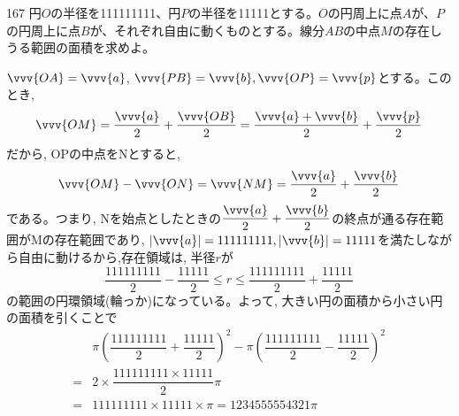 \begin{thm}{167}{}{}
 円$O$の半径を111111111、円$P$の半径を11111とする。$O$の円周上に点$A$が、$P$の円周上に点$B$が、それぞれ自由に動くものとする。線分$AB$の中点$M$の存在しうる範囲の面積を求めよ。 
\end{thm}

$\vvv{OA}=\vvv{a}$, $\vvv{PB}=\vvv{b}, \vvv{OP}=\vvv{p}$とする。このとき,
\[\vvv{OM}=\dfrac{\vvv{a}}{2}+\dfrac{\vvv{OB}}{2}=\dfrac{\vvv{a}+\vvv{b}}{2}+\dfrac{\vvv{p}}{2}\]
だから, OPの中点をNとすると, 
\[\vvv{OM}-\vvv{ON}=\vvv{NM}=\dfrac{\vvv{a}}{2}+\dfrac{\vvv{b}}{2}\]
である。つまり, Nを始点としたときの$\dfrac{\vvv{a}}{2}+\dfrac{\vvv{b}}{2}$の終点が通る存在範囲がMの存在範囲であり, $|\vvv{a}|=111111111, |\vvv{b}|=11111$を満たしながら自由に動けるから,存在領域は, 半径$r$が
\[\dfrac{111111111}{2}-\dfrac{11111}{2}\leq r\leq \dfrac{111111111}{2}+\dfrac{11111}{2}\]
の範囲の円環領域(輪っか)になっている。よって, 大きい円の面積から小さい円の面積を引くことで
\begin{align*}
&\pi\left(\dfrac{111111111}{2}+\dfrac{11111}{2}\right)^2 -\pi\left(\dfrac{111111111}{2}-\dfrac{11111}{2}\right)^2\\
=&2\times \dfrac{111111111\times 11111}{2} \pi\\
=& 111111111\times 11111\times \pi=1234555554321\pi
\end{align*}
